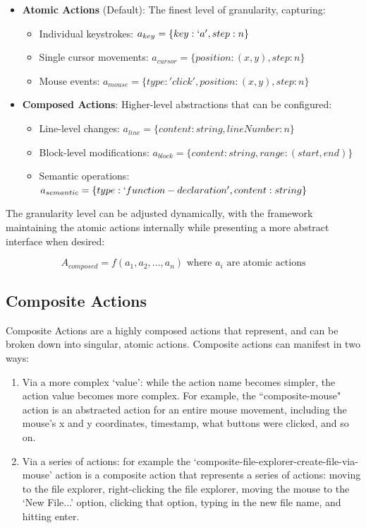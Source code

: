 \documentclass[11pt, a4paper]{article}
\begin{document}
\begin{itemize}
    \item \textbf{Atomic Actions} (Default): The finest level of granularity, capturing:
    \begin{itemize}
        \item Individual keystrokes: \( a_{key} = \{key: `a', step: n\} \)
        \item Single cursor movements: \( a_{cursor} = \{position: (x,y), step: n\} \)
        \item Mouse events: \( a_{mouse} = \{type: 'click', position: (x,y), step: n\} \)
    \end{itemize}
    \item \textbf{Composed Actions}: Higher-level abstractions that can be configured:
    \begin{itemize}
        \item Line-level changes: \( a_{line} = \{content: string, lineNumber: n\} \)
        \item Block-level modifications: \( a_{block} = \{content: string, range: (start, end)\} \)
        \item Semantic operations: \( a_{semantic} = \{type: `function-declaration', content: string\} \)
    \end{itemize}
\end{itemize}

The granularity level can be adjusted dynamically, with the framework maintaining the atomic actions internally while presenting a more abstract interface when desired:

\[
A_{composed} = f(a_1, a_2, ..., a_n) \text{ where } a_i \text{ are atomic actions}
\]

\subsection{Composite Actions}

Composite Actions are a highly composed actions that represent, and can be broken down into singular, atomic actions. Composite actions can manifest in two ways:

\begin{enumerate}
    \item Via a more complex `value': while the action name becomes simpler, the action value becomes more complex. For example, the ``composite-mouse" action is an abstracted action for an entire mouse movement, including the mouse's x and y coordinates, timestamp, what buttons were clicked, and so on.
    \item Via a series of actions: for example the `composite-file-explorer-create-file-via-mouse' action is a composite action that represents a series of actions: moving to the file explorer, right-clicking the file explorer, moving the mouse to the `New File...' option, clicking that option, typing in the new file name, and hitting enter.
\end{enumerate}
\end{document}
